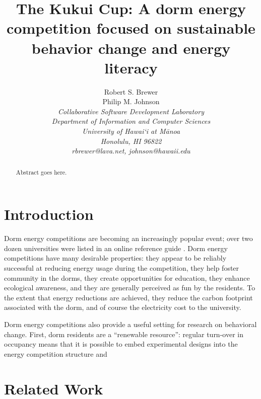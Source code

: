\documentclass[conference,compsoc,peerreview]{IEEEtran}
\begin{document}
\title{The Kukui Cup: A dorm energy competition focused on sustainable behavior change and energy literacy}

\author{Robert S. Brewer\\
        Philip M. Johnson\\
\em     Collaborative Software Development Laboratory\\
        Department of Information and Computer Sciences\\
        University of Hawai`i at M\=anoa\\
        Honolulu, HI 96822\\
        rbrewer@lava.net, johnson@hawaii.edu\\
}


\IEEEpeerreviewmaketitle

\begin{abstract}  %
Abstract goes here.
\end{abstract}


\section{Introduction}
\label{sec:intro}

Dorm energy competitions are becoming an increasingly popular event; over
two dozen universities were listed in an online reference guide
\cite{competitions}.  Dorm energy competitions have many desirable
properties: they appear to be reliably successful at reducing energy usage
during the competition, they help foster community in the dorms, they
create opportunities for education, they enhance ecological awareness, and
they are generally perceived as fun by the residents.  To the extent that
energy reductions are achieved, they reduce the carbon footprint associated
with the dorm, and of course the electricity cost to the university.

Dorm energy competitions also provide a useful setting for research on
behavioral change.   First, dorm residents are a ``renewable resource'':
regular turn-over in occupancy means that it is possible to embed
experimental designs into the energy competition structure and 



\cite{GooglePowerMeter}

\section{Related Work}
\end{document}
